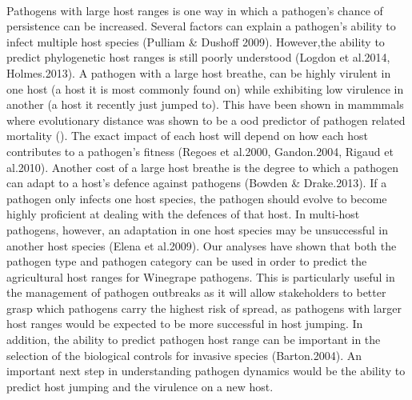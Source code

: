 \documentclass[12pt,letter]{article}
\begin{document}
\paragraph{}Pathogens with large host ranges is one way in which a pathogen's chance of persistence can be increased. Several factors can explain a pathogen's ability to infect multiple host species (Pulliam & Dushoff 2009). However,the ability to predict phylogenetic host ranges is still poorly understood (Logdon et al.2014, Holmes.2013). A pathogen with a large host breathe, can be highly virulent in one host (a host it is most commonly found on) while exhibiting low virulence in another (a host it recently just jumped to). This have been shown in mammmals where evolutionary distance was shown to be a ood predictor of pathogen related mortality (\cite{Farrell2019}). The exact impact of each host will depend on how each host contributes to a pathogen's fitness (Regoes et al.2000, Gandon.2004, Rigaud et al.2010). Another cost of a large host breathe is the degree to which a pathogen can adapt to a host's defence against pathogens (Bowden & Drake.2013). If a pathogen only infects one host species, the pathogen should evolve to become highly proficient at dealing with the defences of that host. In multi-host pathogens, however, an adaptation in one host species may be unsuccessful in another host species (Elena et al.2009). Our analyses have shown that both the pathogen type and pathogen category can be used in order to predict the agricultural host ranges for Winegrape pathogens. This is particularly useful in the management of pathogen outbreaks as it will allow stakeholders to better grasp which pathogens carry the highest risk of spread, as pathogens with larger host ranges would be expected to be more successful in host jumping. In addition, the ability to predict pathogen host range can be important in the selection of the biological controls for invasive species (Barton.2004). An important next step in understanding pathogen dynamics would be the ability to predict host jumping and the virulence on a new host.
\end{document}
